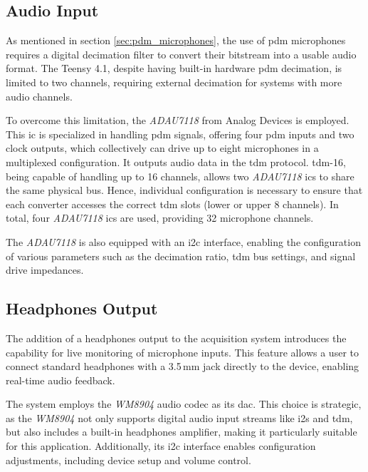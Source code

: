\subsection{Audio Input} \label{sec:acquisition_system_audio_input}
As mentioned in section \ref{sec:pdm_microphones}, the use of \acrshort{pdm} microphones requires a digital decimation filter to convert their bitstream into a usable audio format.
The Teensy 4.1, despite having built-in hardware \acrshort{pdm} decimation, is limited to two channels, requiring external decimation for systems with more audio channels.

To overcome this limitation, the \textit{ADAU7118} from Analog Devices is employed.
This \acrfull{ic} is specialized in handling \acrshort{pdm} signals, offering four \acrshort{pdm} inputs and two clock outputs, which collectively can drive up to eight microphones in a multiplexed configuration.
It outputs audio data in the \acrshort{tdm} protocol.
\acrshort{tdm}-16, being capable of handling up to 16 channels, allows two \textit{ADAU7118} \acrshort{ic}s to share the same physical bus.
Hence, individual configuration is necessary to ensure that each converter accesses the correct \acrshort{tdm} slots (lower or upper 8 channels).
In total, four \textit{ADAU7118} \acrshort{ic}s are used, providing 32 microphone channels.

The \textit{ADAU7118} is also equipped with an \acrshort{i2c} interface, enabling the configuration of various parameters such as the decimation ratio,
\acrshort{tdm} bus settings, and signal drive impedances.


\subsection{Headphones Output}
The addition of a headphones output to the acquisition system introduces the capability for live monitoring of microphone inputs.
This feature allows a user to connect standard headphones with a 3.5\,mm jack directly to the device, enabling real-time audio feedback.

The system employs the \textit{WM8904} audio \acrshort{codec} as its \acrfull{dac}.
This choice is strategic, as the \textit{WM8904} not only supports digital audio input streams like \acrshort{i2s} and \acrshort{tdm},
but also includes a built-in headphones amplifier, making it particularly suitable for this application.
Additionally, its \acrshort{i2c} interface enables configuration adjustments, including device setup and volume control.

